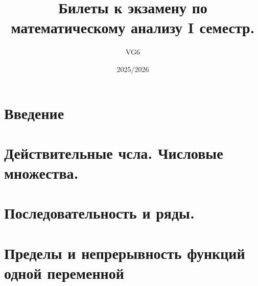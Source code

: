\documentclass[12pt, a4paper]{article}
\title{Билеты к экзамену по математическому анализу I семестр.}
\author{VG6}
\date{2025/2026}
\begin{document}
\maketitle
\tableofcontents
\newpage

\section{Введение}



\section{Действительные чсла. Числовые множества.}


\section{Последовательность и ряды.}




























\section{Пределы и непрерывность функций одной переменной}























\end{document}
